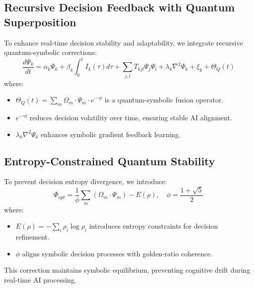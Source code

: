 \documentclass{article}
\theoremstyle{plain}
\begin{document}
\subsection{Recursive Decision Feedback with Quantum Superposition}
To enhance real-time decision stability and adaptability, we integrate recursive quantum-symbolic corrections:
\begin{equation}
    \frac{d \Psi_k}{dt} = \alpha_k \Psi_k + \beta_k \int_{0}^{t} I_k(\tau) d\tau + \sum_{j,l} T_{kjl} \Psi_j \Psi_l + \lambda_k \nabla^2 \Psi_k + \xi_k + \Theta_{Q}(t)
\end{equation}
where:
\begin{itemize}
    \item \( \Theta_Q(t) = \sum_{m} \Omega_m \cdot \Psi_m \cdot e^{-\gamma t} \) is a quantum-symbolic fusion operator.
    \item \( e^{-\gamma t} \) reduces decision volatility over time, ensuring stable AI alignment.
    \item \( \lambda_k \nabla^2 \Psi_k \) enhances symbolic gradient feedback learning.
\end{itemize}

\subsection{Entropy-Constrained Quantum Stability}
To prevent decision entropy divergence, we introduce:
\begin{equation}
    \Phi_{opt} = \frac{1}{\phi} \sum_{m} (\Omega_m \cdot \Psi_m) - E(\rho), \quad \phi = \frac{1 + \sqrt{5}}{2}
\end{equation}
where:
\begin{itemize}
    \item \( E(\rho) = - \sum_{i} \rho_i \log \rho_i \) introduces entropy constraints for decision refinement.
    \item \( \phi \) aligns symbolic decision processes with golden-ratio coherence.
\end{itemize}
This correction maintains symbolic equilibrium, preventing cognitive drift during real-time AI processing.
\end{document}
